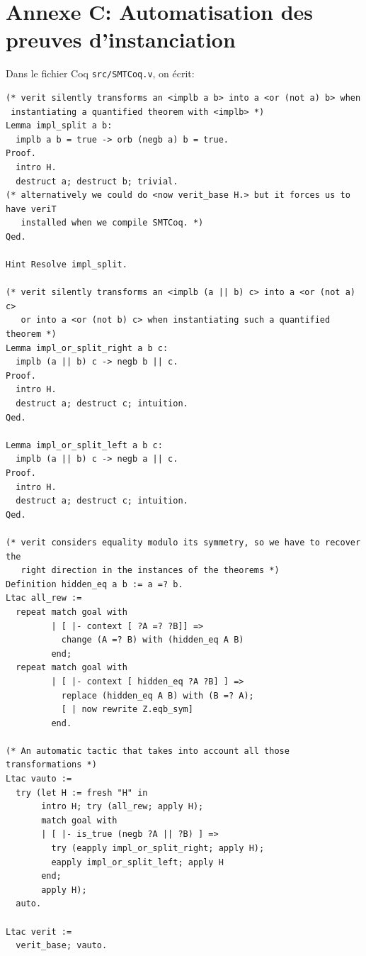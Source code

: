 \documentclass[11pt]{article}
\begin{document}
\section*{Annexe C: Automatisation des preuves d'instanciation}
Dans le fichier Coq \texttt{src/SMTCoq.v}, on écrit:
\lstset{language=coq}
\begin{lstlisting}[frame=single]
(* verit silently transforms an <implb a b> into a <or (not a) b> when
 instantiating a quantified theorem with <implb> *)
Lemma impl_split a b:
  implb a b = true -> orb (negb a) b = true.
Proof.
  intro H.
  destruct a; destruct b; trivial.
(* alternatively we could do <now verit_base H.> but it forces us to have veriT
   installed when we compile SMTCoq. *)
Qed.

Hint Resolve impl_split.

(* verit silently transforms an <implb (a || b) c> into a <or (not a) c> 
   or into a <or (not b) c> when instantiating such a quantified theorem *)
Lemma impl_or_split_right a b c:
  implb (a || b) c -> negb b || c.
Proof.
  intro H.
  destruct a; destruct c; intuition. 
Qed.

Lemma impl_or_split_left a b c:
  implb (a || b) c -> negb a || c.
Proof.
  intro H.
  destruct a; destruct c; intuition.
Qed.

(* verit considers equality modulo its symmetry, so we have to recover the
   right direction in the instances of the theorems *)
Definition hidden_eq a b := a =? b.
Ltac all_rew :=
  repeat match goal with
         | [ |- context [ ?A =? ?B]] =>
           change (A =? B) with (hidden_eq A B)
         end;
  repeat match goal with
         | [ |- context [ hidden_eq ?A ?B] ] =>
           replace (hidden_eq A B) with (B =? A);
           [ | now rewrite Z.eqb_sym]
         end.

(* An automatic tactic that takes into account all those transformations *)
Ltac vauto :=
  try (let H := fresh "H" in
       intro H; try (all_rew; apply H);
       match goal with
       | [ |- is_true (negb ?A || ?B) ] =>
         try (eapply impl_or_split_right; apply H);
         eapply impl_or_split_left; apply H
       end;
       apply H);
  auto.

Ltac verit :=
  verit_base; vauto.
\end{lstlisting}
\end{document}
